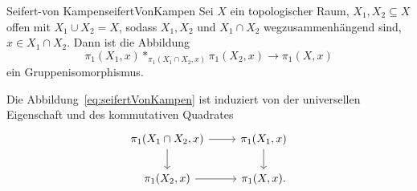 \documentclass[language=ngerman]{TemplateLecture} %
\begin{document}


\begin{thm}{Seifert-von Kampen}{seifertVonKampen}
    Sei $X$ ein topologischer Raum, $X_1, X_2 \subseteq X$ offen mit $X_1 \cup X_2 = X$, sodass $X_1, X_2$ und $X_1 \cap X_2$ wegzusammenhängend sind, $x \in X_1 \cap X_2$. Dann ist die Abbildung
    \begin{equation}
        \pi_1(X_1, x) *_{\pi_1(X_1 \cap X_2, x)} \pi_1(X_2, x) \longrightarrow \pi_1(X,x) \label{eq:seifertVonKampen}
    \end{equation}
    ein Gruppenisomorphismus.
\end{thm}

\begin{remark}
    Die Abbildung~\eqref{eq:seifertVonKampen} ist induziert von der universellen Eigenschaft und des kommutativen Quadrates
    \begin{equation*}
        \begin{tikzcd}
            \pi_1(X_1 \cap X_2, x) \arrow[r] \arrow[d]  & \pi_1(X_1, x) \arrow[d] \\
            \pi_1(X_2, x) \arrow[r] & \pi_1(X, x).
        \end{tikzcd}
    \end{equation*}
\end{remark}
\end{document}
